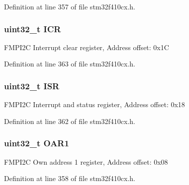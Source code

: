Definition at line 357 of file stm32f410cx.\+h.

\subsubsection[{\texorpdfstring{I\+CR}{ICR}}]{ uint32\+\_\+t I\+CR}\hypertarget{struct_f_m_p_i2_c___type_def_a0a8c8230846fd8ff154b9fde8dfa0399}{}\label{struct_f_m_p_i2_c___type_def_a0a8c8230846fd8ff154b9fde8dfa0399}
F\+M\+P\+I2C Interrupt clear register, Address offset\+: 0x1C 

Definition at line 363 of file stm32f410cx.\+h.

\subsubsection[{\texorpdfstring{I\+SR}{ISR}}]{ uint32\+\_\+t I\+SR}\hypertarget{struct_f_m_p_i2_c___type_def_ab3c49a96815fcbee63d95e1e74f20e75}{}\label{struct_f_m_p_i2_c___type_def_ab3c49a96815fcbee63d95e1e74f20e75}
F\+M\+P\+I2C Interrupt and status register, Address offset\+: 0x18 

Definition at line 362 of file stm32f410cx.\+h.

\subsubsection[{\texorpdfstring{O\+A\+R1}{OAR1}}]{ uint32\+\_\+t O\+A\+R1}\hypertarget{struct_f_m_p_i2_c___type_def_a08b4be0d626a00f26bc295b379b3bba6}{}\label{struct_f_m_p_i2_c___type_def_a08b4be0d626a00f26bc295b379b3bba6}
F\+M\+P\+I2C Own address 1 register, Address offset\+: 0x08 

Definition at line 358 of file stm32f410cx.\+h.

